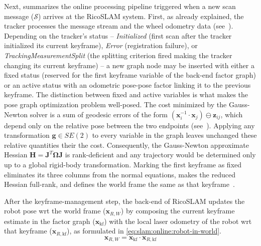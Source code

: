 Next,  summarizes the online processing pipeline
triggered when a new scan message ($\mathcal{S}$) arrives at
the RicoSLAM system. First, as already explained, the tracker processes
the message stream and the wheel odometry data
(see~). Depending on the tracker's status --
\emph{Initialized} (first scan after the tracker initialized its current
keyframe), \emph{Error} (registration failure), or
\emph{TrackingMeasurementSplit} (the splitting criterion fired making
the tracker changing its current keyframe) -- a new graph node may be inserted
with either a fixed status (reserved for the first keyframe variable of
the back-end factor graph) or an active status with an odometric pose-pose
factor linking it to the previous keyframe. The distinction between
fixed and active variables is what makes the pose graph optimization problem
well-posed. The cost minimized by the Gauss-Newton solver is a sum of
geodesic errors of the form
$\left(\mathbf{x}_i^{-1}\cdot\mathbf{x}_j\right)\ominus\mathbf{z}_{ij}$,
which depend only on the relative pose between the two endpoints
(see~). Applying any transformation
$\mathbf{g}\in SE(2)$ to every variable in the graph leaves unchanged
these relative quantities their the cost. Consequently,
the Gauss-Newton approximate Hessian
$\mathbf{H} = \mathbf{J}^{T}\boldsymbol{\Omega}\mathbf{J}$ is
rank-deficient and any trajectory would be determined only up to
a global rigid-body transformation. Marking the first keyframe as
fixed eliminates its three columns from the normal equations, makes the reduced
Hessian full-rank, and defines the world frame the same as that
keyframe~\cite{grisetti:itsm:2010,grisetti:robotics:2020}.



After the keyframe-management step, the back-end of RicoSLAM updates
the robot pose \gls{wrt} the world frame ($\mathbf{x}_{R,W}$)
by composing the current keyframe estimate in the factor graph
($\mathbf{x}_{\mathrm{kf}}$) with the local laser odometry of the robot
\gls{wrt} that keyframe ($\mathbf{x}_{R,\mathrm{kf}}$), as formulated in
\eqref{eq:slam:online:robot-in-world}.
\begin{equation}
\label{eq:slam:online:robot-in-world}
\mathbf{x}_{R,W} = \mathbf{x}_{\mathrm{kf}}\cdot\mathbf{x}_{R,\mathrm{kf}}
\end{equation}

